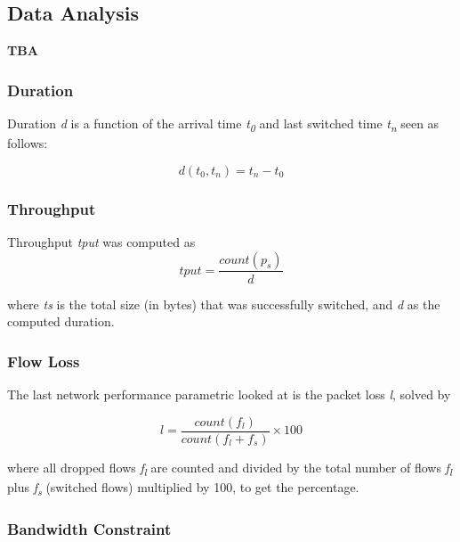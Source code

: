 \documentclass[journal]{IEEE/IEEEtran}
\begin{document}

\subsection{Data Analysis}
\textbf{TBA}

\subsubsection{Duration}

Duration \textit{d} is a function of the arrival time \textit{t\textsubscript{0}} and last switched time \textit{t\textsubscript{n}} seen as follows:

\[
	d(t_0, t_n) = t_n - t_0
\]

\subsubsection{Throughput}

Throughput \textit{tput} was computed as 
\[
	tput = \frac{count(p_s)}{d}
\]

where \textit{ts} is the total size (in bytes) that was successfully switched, and \textit{d} as the computed duration. 

\subsubsection{Flow Loss}

The last network performance parametric looked at is the packet loss \textit{l}, solved by

\[
	l = \frac{count(f_l)}{count(f_l + f_s)} \times 100
\]

where all dropped flows \textit{f\textsubscript{l}} are counted and divided by the total number of flows \textit{f\textsubscript{l}} plus \textit{f\textsubscript{s}} (switched flows) multiplied by 100, to get the percentage. 

\subsubsection{Bandwidth Constraint}
\end{document}
